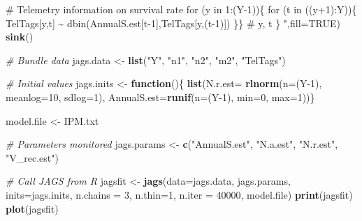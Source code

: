 \documentclass[
]{krantz}
\makeatletter
\newenvironment{Shaded}{\begin{snugshade}}{\end{snugshade}}
\newcommand{\AttributeTok}[1]{\textcolor[rgb]{0.27,0.27,0.27}{#1}}
\newcommand{\CommentTok}[1]{\textcolor[rgb]{0.37,0.37,0.37}{\textit{#1}}}
\newcommand{\ConstantTok}[1]{\textcolor[rgb]{0.37,0.37,0.37}{#1}}
\newcommand{\ControlFlowTok}[1]{\textcolor[rgb]{0.27,0.27,0.27}{\textbf{#1}}}
\newcommand{\DecValTok}[1]{\textcolor[rgb]{0.06,0.06,0.06}{#1}}
\newcommand{\FunctionTok}[1]{\textcolor[rgb]{0.27,0.27,0.27}{\textbf{#1}}}
\newcommand{\NormalTok}[1]{#1}
\newcommand{\OtherTok}[1]{\textcolor[rgb]{0.37,0.37,0.37}{#1}}
\newcommand{\StringTok}[1]{\textcolor[rgb]{0.5,0.5,0.5}{#1}}
\newenvironment{kframe}{%
\medskip{}
\setlength{\fboxsep}{.8em}
 \def\at@end@of@kframe{}%
 \ifinner\ifhmode%
  \def\at@end@of@kframe{\end{minipage}}%
  \begin{minipage}{\columnwidth}%
 \fi\fi%
 \def\FrameCommand##1{\hskip\@totalleftmargin \hskip-\fboxsep
 \colorbox{shadecolor}{##1}\hskip-\fboxsep
     \hskip-\linewidth \hskip-\@totalleftmargin \hskip\columnwidth}%
 \MakeFramed {\advance\hsize-\width
   \@totalleftmargin\z@ \linewidth\hsize
   \@setminipage}}%
 {\par\unskip\endMakeFramed%
 \at@end@of@kframe}
\renewenvironment{Shaded}{\begin{kframe}}{\end{kframe}}
\makeatother
\begin{document}
\begin{Shaded}
\begin{Highlighting}[]
\StringTok{\# Telemetry information on survival rate}
\StringTok{for (y in 1:(Y{-}1))\{}
\StringTok{  for (t in ((y+1):Y))\{}
\StringTok{    TelTags[y,t] \textasciitilde{} dbin(AnnualS.est[t{-}1],TelTags[y,(t{-}1)])}
\StringTok{  \}\} \# y, t}
\StringTok{\}}
\StringTok{    "}\NormalTok{,}\AttributeTok{fill=}\ConstantTok{TRUE}\NormalTok{)}
\FunctionTok{sink}\NormalTok{()}

\CommentTok{\# Bundle data}
\NormalTok{jags.data }\OtherTok{\textless{}{-}} \FunctionTok{list}\NormalTok{(}\StringTok{"Y"}\NormalTok{, }\StringTok{"n1"}\NormalTok{, }\StringTok{"n2"}\NormalTok{, }\StringTok{"m2"}\NormalTok{, }\StringTok{"TelTags"}\NormalTok{)}

\CommentTok{\# Initial values}
\NormalTok{jags.inits }\OtherTok{\textless{}{-}} \ControlFlowTok{function}\NormalTok{()\{ }\FunctionTok{list}\NormalTok{(}\AttributeTok{N.r.est=} \FunctionTok{rlnorm}\NormalTok{(}\AttributeTok{n=}\NormalTok{(Y}\DecValTok{{-}1}\NormalTok{), }\AttributeTok{meanlog=}\DecValTok{10}\NormalTok{,}
                                               \AttributeTok{sdlog=}\DecValTok{1}\NormalTok{),}
                               \AttributeTok{AnnualS.est=}\FunctionTok{runif}\NormalTok{(}\AttributeTok{n=}\NormalTok{(Y}\DecValTok{{-}1}\NormalTok{), }\AttributeTok{min=}\DecValTok{0}\NormalTok{, }
                                                 \AttributeTok{max=}\DecValTok{1}\NormalTok{))\}}

\NormalTok{model.file }\OtherTok{\textless{}{-}} \StringTok{\textquotesingle{}IPM.txt\textquotesingle{}}

\CommentTok{\# Parameters monitored}
\NormalTok{jags.params }\OtherTok{\textless{}{-}} \FunctionTok{c}\NormalTok{(}\StringTok{"AnnualS.est"}\NormalTok{, }\StringTok{"N.a.est"}\NormalTok{, }\StringTok{"N.r.est"}\NormalTok{, }\StringTok{"V\_rec.est"}\NormalTok{)}

\CommentTok{\# Call JAGS from R}
\NormalTok{jagsfit }\OtherTok{\textless{}{-}} \FunctionTok{jags}\NormalTok{(}\AttributeTok{data=}\NormalTok{jags.data, jags.params, }\AttributeTok{inits=}\NormalTok{jags.inits,}
                \AttributeTok{n.chains =} \DecValTok{3}\NormalTok{, }\AttributeTok{n.thin=}\DecValTok{1}\NormalTok{, }\AttributeTok{n.iter =} \DecValTok{40000}\NormalTok{,}
\NormalTok{                model.file)}
\FunctionTok{print}\NormalTok{(jagsfit)}
\FunctionTok{plot}\NormalTok{(jagsfit)}


\end{Highlighting}
\end{Shaded}
\end{document}
